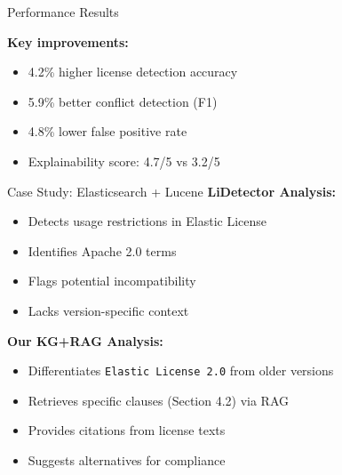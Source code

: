 \documentclass{beamer}
\begin{document}
\begin{frame}{Performance Results}
\begin{center}
\end{center}

\textbf{Key improvements:}
\begin{itemize}
\item 4.2\% higher license detection accuracy
\item 5.9\% better conflict detection (F1)
\item 4.8\% lower false positive rate
\item Explainability score: 4.7/5 vs 3.2/5
\end{itemize}
\end{frame}

\begin{frame}{Case Study: Elasticsearch + Lucene}
\textbf{LiDetector Analysis:}
\begin{itemize}
\item Detects usage restrictions in Elastic License
\item Identifies Apache 2.0 terms
\item Flags potential incompatibility 
\item Lacks version-specific context
\end{itemize}

\textbf{Our KG+RAG Analysis:}
\begin{itemize}
\item Differentiates \texttt{Elastic License 2.0} from older versions
\item Retrieves specific clauses (Section 4.2) via RAG
\item Provides citations from license texts
\item Suggests alternatives for compliance
\end{itemize}
\end{frame}
\end{document}
